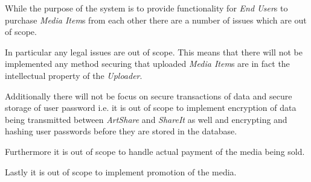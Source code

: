 \documentclass[../report.tex]{subfiles}
\begin{document}
While the purpose of the system is to provide functionality for \textit{End User}s to purchase \textit{Media Item}s from each other there are a number of issues which are out of scope. 

In particular any legal issues are out of scope. This means that there will not be implemented any method securing that uploaded \textit{Media Item}s are in fact the intellectual property of the \textit{Uploader}. 

Additionally there will not be focus on secure transactions of data and secure storage of user password i.e. it is out of scope to implement encryption of data being transmitted between \textit{ArtShare} and \textit{ShareIt} as well and encrypting and hashing user passwords before they are stored in the database. 

Furthermore it is out of scope to handle actual payment of the media being sold.

Lastly it is out of scope to implement promotion of the media.
\end{document}
